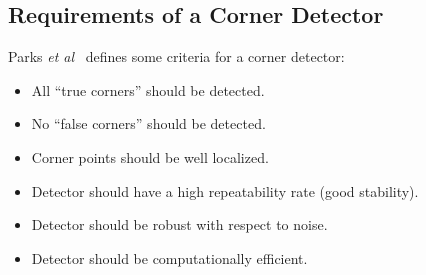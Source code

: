 \subsection{Requirements of a Corner Detector}
\label{sec:req-corner-detector}
Parks \textit{et al}~\cite{Parks:11} defines some criteria for a corner detector:
\begin{itemize}
	\item All ``true corners'' should be detected.
	\item No ``false corners'' should be detected. 
	\item Corner points should be well localized.
  \item Detector should have a high repeatability rate (good stability).
	\item Detector should be robust with respect to noise.
	\item Detector should be computationally efficient.	
\end{itemize}

